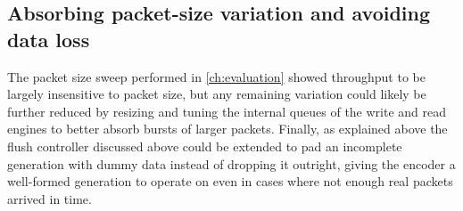 \subsection{Absorbing packet-size variation and avoiding data loss}

The packet size sweep performed in \ref{ch:evaluation} showed throughput to be largely
insensitive to packet size, but any remaining variation could likely be further reduced by
resizing and tuning the internal queues of the write and read engines to better absorb bursts of
larger packets. Finally, as explained above the flush controller discussed above could be extended 
to pad an incomplete generation with dummy data instead of dropping it outright, giving the encoder a
well-formed generation to operate on even in cases where not enough real packets arrived in
time.
